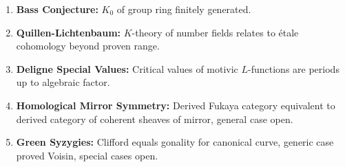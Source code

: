 \documentclass[aps,prd,amsmath,amssymb,twocolumn,superscriptaddress]{revtex4-2}
\begin{document}
\begin{enumerate}[label={\bf \arabic*.}, leftmargin=*, itemsep=2pt]
\item \textbf{Bass Conjecture:} $K_0$ of group ring finitely generated.

\item \textbf{Quillen-Lichtenbaum:} $K$-theory of number fields relates to \'etale cohomology beyond proven range.

\item \textbf{Deligne Special Values:} Critical values of motivic $L$-functions are periods up to algebraic factor.

\item \textbf{Homological Mirror Symmetry:} Derived Fukaya category equivalent to derived category of coherent sheaves of mirror, general case open.

\item \textbf{Green Syzygies:} Clifford equals gonality for canonical curve, generic case proved Voisin, special cases open.

\end{enumerate}
\end{document}
